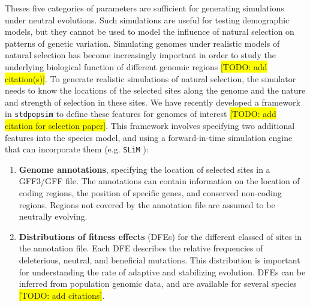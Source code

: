 \documentclass[hidelinks]{article}
\begin{document}
Theses five categories of parameters are sufficient for generating simulations under neutral evolutions. Such simulations are useful for testing demographic models, but they cannot be used to model the influence of natural selection on patterns of genetic variation.
Simulating genomes under realistic models of natural selection has become increasingly important in order to study the underlying biological function of different genomic regions \colorbox{yellow}{[TODO: add citation(s)]}.
To generate realistic simulations of natural selection, the simulator needs to know the locations of the selected sites along the genome and the nature and strength of selection in these sites. We have recently developed a framework in \texttt{stdpopsim} to define these features for genomes of interest  \colorbox{yellow}{[TODO: add citation for selection paper]}. This framework involves specifying two additional features into the species model, and using a forward-in-time simulation engine that can incorporate them (e.g. \texttt{SLiM} \citep{Haller2019}):

\begin{enumerate}
	\def\labelenumi{\arabic{enumi}.}
	\setcounter{enumi}{5}
	\item
	\textbf{Genome annotations}, specifying the location of selected sites in a GFF3/GFF file. The annotations can contain information on the location of coding regions, the position of specific genes, and conserved non-coding regions. Regions not covered by the annotation file are assumed to be neutrally evolving.
	\item
	\textbf{Distributions of fitness effects} (DFEs) for the different classed of sites in the annotation file. Each DFE describes the relative frequencies of deleterious, neutral, and beneficial mutations. This distribution is important for understanding the rate of adaptive and stabilizing evolution. DFEs can be inferred from population genomic data, and are available for several species \colorbox{yellow}{[TODO: add citations]}.
\end{enumerate}
\end{document}
